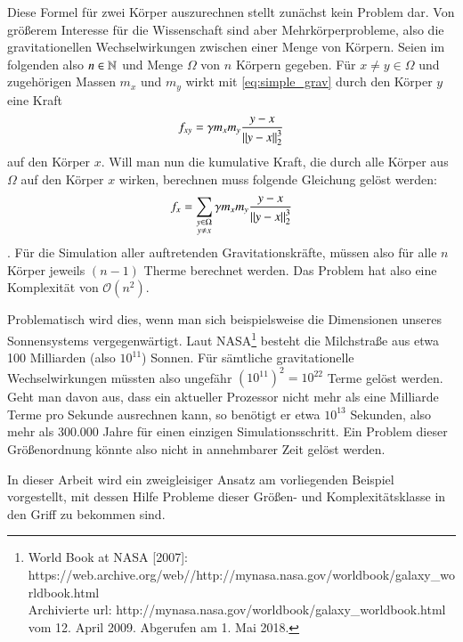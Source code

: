    Diese Formel für zwei Körper auszurechnen stellt zunächst kein Problem dar. Von größerem Interesse für die Wissenschaft sind aber Mehrkörperprobleme, also die gravitationellen 
    Wechselwirkungen zwischen einer Menge von Körpern. Seien im folgenden also $n \in \mathbb{N}$ und Menge $\Omega$ von $n$ Körpern gegeben.
    Für $x \neq y \in \Omega$ und zugehörigen Massen $m_x$ und $m_y$ wirkt mit \autoref{eq:simple_grav} durch den Körper $y$ eine Kraft 
    \begin{equation}
      f_{xy} = \gamma m_x m_y \frac{y - x}{\left\lVert y - x\right\rVert^3_2}
      \label{eq:multi_grav}
    \end{equation}
    auf den Körper $x$. Will man nun die kumulative Kraft, die durch alle Körper aus $\Omega$ auf den Körper $x$ wirken, berechnen muss folgende Gleichung gelöst werden:
    \begin{equation}
      f_x = \sum_{\substack{y \in \Omega \\ y \neq x}} \gamma m_x m_y \frac{y - x}{\left\lVert y - x\right\rVert^3_2}
      \label{eq:sum_grav}
    \end{equation}
    \citep{wissrech}.
    Für die Simulation aller auftretenden Gravitationskräfte, müssen also für alle $n$ Körper jeweils $(n-1)$ Therme berechnet werden. Das Problem hat also eine Komplexität von
    $\mathcal{O}(n^2)$.
    
    Problematisch wird dies, wenn man sich beispielsweise die Dimensionen unseres Sonnensystems vergegenwärtigt. Laut NASA\footnote{
    World Book at NASA [2007]: 
    https://web.archive.org/\-web//\-http://mynasa.nasa.gov/\-worldbook/\-galaxy\_worldbook.html\\
    Archivierte url: http://mynasa.nasa.gov/worldbook/galaxy\_worldbook.html vom 12. April 2009. Abgerufen am 1. Mai 2018.} besteht die Milchstraße aus etwa 100 Milliarden
    (also $10^{11}$) Sonnen. Für sämtliche gravitationelle Wechselwirkungen müssten also ungefähr $(10^{11})^2 = 10^{22}$ Terme gelöst werden. Geht man davon aus, dass ein aktueller 
    Prozessor nicht mehr als eine Milliarde Terme pro Sekunde ausrechnen kann, so benötigt er etwa $10^{13}$ Sekunden, also mehr als 300.000 Jahre für einen einzigen Simulationsschritt.
    Ein Problem dieser Größenordnung könnte also nicht in annehmbarer Zeit gelöst werden.\citep{wissrech} 
    
    In dieser Arbeit wird ein zweigleisiger Ansatz am vorliegenden Beispiel vorgestellt, mit dessen Hilfe Probleme dieser Größen- und Komplexitätsklasse in den Griff zu bekommen sind.
    
